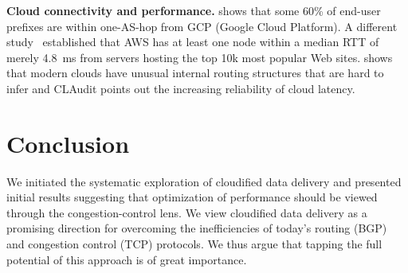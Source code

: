 \documentclass[newfonts=false,format=sigconf,anonymous,10pt,letterpaper]{acmart}
\providecommand{\eg}{\emph{e.g.,} }
\newcommand{\T}[1]{\smallskip\noindent\textbf{#1}} %
\newcommand{\sockets}{Berkeley sockets\xspace}
\begin{document}
\T{Cloud connectivity and performance.} \cite{one-hop} shows that some 60\% of end-user prefixes are within one-AS-hop from GCP (Google Cloud Platform). A different study~\cite{cgn2017} established that AWS has at least one node within a median RTT of merely 4.8~ms from servers hosting the top 10k most popular Web sites. \cite{unusual} shows that modern clouds have unusual internal routing structures that are hard to infer and CLAudit \cite{multidimensional} points out the increasing reliability of cloud latency. 



\section{Conclusion}\label{sec:conclusion}
We initiated the systematic exploration of cloudified data delivery and presented initial results suggesting that optimization of performance should be viewed through the congestion-control lens.  We view cloudified data delivery as a promising direction for overcoming the inefficiencies of today's routing (BGP) and congestion control (TCP) protocols. We thus argue that tapping the full potential of this approach is of great importance. 




\end{document}
